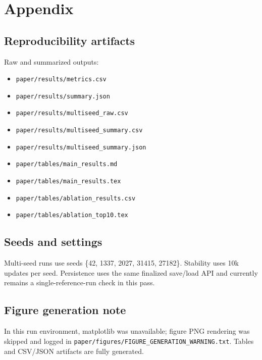 \section{Appendix}
\subsection{Reproducibility artifacts}
Raw and summarized outputs:
\begin{itemize}
  \item \texttt{paper/results/metrics.csv}
  \item \texttt{paper/results/summary.json}
  \item \texttt{paper/results/multiseed\_raw.csv}
  \item \texttt{paper/results/multiseed\_summary.csv}
  \item \texttt{paper/results/multiseed\_summary.json}
  \item \texttt{paper/tables/main\_results.md}
  \item \texttt{paper/tables/main\_results.tex}
  \item \texttt{paper/tables/ablation\_results.csv}
  \item \texttt{paper/tables/ablation\_top10.tex}
\end{itemize}

\subsection{Seeds and settings}
Multi-seed runs use seeds \{42, 1337, 2027, 31415, 27182\}. Stability uses 10k updates per seed. Persistence uses the same finalized save/load API and currently remains a single-reference-run check in this pass.

\subsection{Figure generation note}
In this run environment, matplotlib was unavailable; figure PNG rendering was skipped and logged in \texttt{paper/figures/FIGURE\_GENERATION\_WARNING.txt}. Tables and CSV/JSON artifacts are fully generated.
